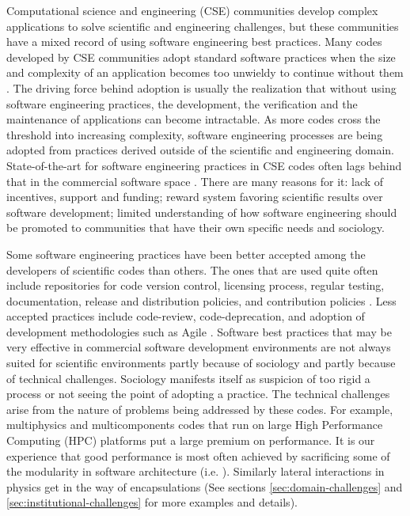 \label{sec:introduction}
Computational science and engineering (CSE) communities develop
complex applications to solve scientific and engineering challenges,
but these communities have a mixed record of using software
engineering best practices. Many codes developed by CSE communities
adopt standard software practices when the size and complexity of an
application becomes too unwieldy to continue without them
\cite{cc2012}. The driving force behind adoption is usually the
realization that without using software engineering practices, the
development, the verification and the maintenance of applications can become
intractable. As more codes cross the threshold into increasing
complexity, software engineering processes are being adopted from
practices derived outside of the scientific and engineering domain.
State-of-the-art for software engineering practices in CSE codes often lags
behind that in the commercial software space
\cite{segal2008developing,basili2008understanding, hochstein2008asc}. 
There are many reasons for it: lack of incentives, support and
funding; reward system favoring scientific results over software 
development; limited understanding of how software engineering
should be promoted to communities that have their own 
specific needs and sociology.

Some software engineering practices have been better accepted 
among the developers of scientific codes than others. The ones that are
used quite often include repositories for code version control,
licensing process, regular testing, documentation, release and distribution
policies, and contribution policies \cite{cc2012, carver2012software,
Dubey2014}. Less accepted practices include code-review,
code-deprecation, and adoption of development methodologies such as
Agile \cite{agile}. Software best practices that may be very effective in commercial
software development environments are not always suited for scientific
environments partly because of sociology and partly because of technical
challenges. Sociology manifests itself as suspicion of too rigid a
process or not seeing the point of adopting a practice. The
technical challenges arise from the nature of problems being addressed by
these codes. For example, multiphysics and multicomponents  
codes that run on large High Performance Computing 
(HPC) platforms put a large premium on performance. It is our
experience that good performance is most often achieved by sacrificing
some of the modularity in software architecture
(i.e. \cite{Dubey1999}). Similarly lateral interactions in physics get
in the way of encapsulations (See sections \ref{sec:domain-challenges}
and \ref{sec:institutional-challenges} for more examples and details).

